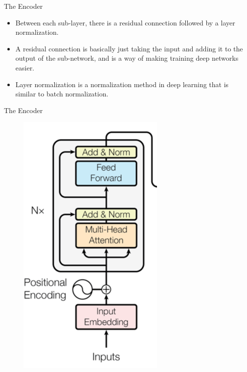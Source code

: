 \documentclass[handout]{beamer}
\begin{document}
\begin{frame}{The Encoder}
\begin{scriptsize}
\begin{itemize}

\item Between each sub-layer, there is a residual connection followed by a layer normalization. 

\item A residual connection is basically just taking the input and adding it to the output of the sub-network, and is a way of making training deep networks easier. 

\item Layer normalization is a normalization method in deep learning that is similar to batch normalization.
 
\end{itemize}

\end{scriptsize}

\end{frame}



\begin{frame}{The Encoder}

     \begin{figure}[h]
        	\includegraphics[scale = 0.39]{pics/transformerencoder.png}
        \end{figure}  


\end{frame}
\end{document}
